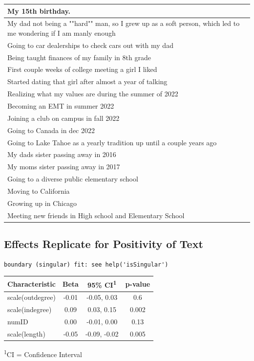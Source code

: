 \documentclass[
  .7em,
  letterpaper,
  DIV=11,
  numbers=noendperiod]{scrartcl}
\begin{document}
\begin{table}
\begin{tabular}{l}
\hline
My 15th birthday.\\
\hline
My dad not being a ""hard"" man, so I grew up as a soft person, which led to me wondering if I am manly enough\\
\hline
Going to car dealerships to check cars out with my dad\\
\hline
Being taught finances of my family in 8th grade\\
\hline
First couple weeks of college meeting a girl I liked\\
\hline
Started dating that girl after almost a year of talking\\
\hline
Realizing what my values are during the summer of 2022\\
\hline
Becoming an EMT in summer 2022\\
\hline
Joining a club on campus in fall 2022\\
\hline
Going to Canada in dec 2022\\
\hline
Going to Lake Tahoe as a yearly tradition up until a couple years ago\\
\hline
My dads sister passing away in 2016\\
\hline
My moms sister passing away in 2017\\
\hline
Going to a diverse public elementary school\\
\hline
Moving to California\\
\hline
Growing up in Chicago\\
\hline
Meeting new friends in High school and Elementary School\\
\hline
\end{tabular}
\end{table}

\hypertarget{effects-replicate-for-positivity-of-text}{%
\subsection{Effects Replicate for Positivity of
Text}\label{effects-replicate-for-positivity-of-text}}

\begin{verbatim}
boundary (singular) fit: see help('isSingular')
\end{verbatim}

\captionsetup[table]{labelformat=empty,skip=1pt}
\setlength{\LTpost}{0mm}
\begin{longtable}{lccc}
\toprule
\textbf{Characteristic} & \textbf{Beta} & \textbf{95\% CI}\textsuperscript{1} & \textbf{p-value} \\ 
\midrule
scale(outdegree) & -0.01 & -0.05, 0.03 & 0.6 \\ 
scale(indegree) & 0.09 & 0.03, 0.15 & 0.002 \\ 
numID & 0.00 & -0.01, 0.00 & 0.13 \\ 
scale(length) & -0.05 & -0.09, -0.02 & 0.005 \\ 
\bottomrule
\end{longtable}
\begin{minipage}{\linewidth}
\textsuperscript{1}CI = Confidence Interval\\
\end{minipage}
\end{document}
